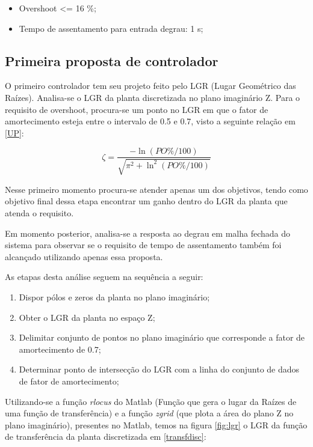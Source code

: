 \documentclass[a4paper,11pt]{article}
\begin{document}
\begin{itemize}
   \item Overshoot <= 16 \%;
   \item Tempo de assentamento para entrada degrau: 1 s;
 \end{itemize}

\subsection{Primeira proposta de controlador}

O primeiro controlador tem seu projeto feito pelo LGR (Lugar Geométrico das Raízes). Analisa-se o LGR da planta discretizada no plano imaginário Z. Para o requisito de overshoot, procura-se um ponto no LGR em que o fator de amortecimento esteja entre o intervalo de 0.5 e 0.7, visto a seguinte relação em \ref{UP}:

\begin{equation}
\zeta=\frac{-\ln \left(P O\% / 100\right)}{\sqrt{\pi^{2}+\ln ^{2}\left(P O\% / 100\right)}}
\label{UP}
\end{equation}

Nesse primeiro momento procura-se atender apenas um dos objetivos, tendo como objetivo final dessa etapa encontrar um ganho dentro do LGR da planta que atenda o requisito. 

Em momento posterior, analisa-se a resposta ao degrau em malha fechada do sistema para observar se o requisito de tempo de assentamento também foi alcançado utilizando apenas essa proposta. 

As etapas desta análise seguem na sequência a seguir:

\begin{enumerate}
   \item Dispor pólos e zeros da planta no plano imaginário;
   \item Obter o LGR da planta no espaço Z;
   \item Delimitar conjunto de pontos no plano imaginário que corresponde a fator de amortecimento de 0.7;
   \item Determinar ponto de intersecção do LGR com a linha do conjunto de dados de fator de amortecimento;
 \end{enumerate}

Utilizando-se a função \textit{rlocus} do Matlab (Função que gera o lugar da Raízes de uma função de transferência) e a função \textit{zgrid} (que plota a área do plano Z no plano imaginário), presentes no Matlab, temos na figura \ref{fig:lgr} o LGR da função de transferência da planta discretizada em \ref{transfdisc}:
\end{document}
